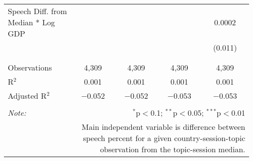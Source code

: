 \begin{table}[!htbp]
\begin{tabular}{@{\extracolsep{5pt}}lcccc}
 Speech Diff. from Median * Log GDP &  &  &  & 0.0002 \\ 
  &  &  &  & (0.011) \\ 
  & & & & \\ 
\hline \\[-1.8ex] 
Observations & 4,309 & 4,309 & 4,309 & 4,309 \\ 
R$^{2}$ & 0.001 & 0.001 & 0.001 & 0.001 \\ 
Adjusted R$^{2}$ & $-$0.052 & $-$0.052 & $-$0.053 & $-$0.053 \\ 
\hline 
\hline \\[-1.8ex] 
\textit{Note:}  & \multicolumn{4}{r}{$^{*}$p$<$0.1; $^{**}$p$<$0.05; $^{***}$p$<$0.01} \\ 
 & \multicolumn{4}{r}{Main independent variable is difference between speech percent for a given country-session-topic observation from the topic-session median.} \\ 
\end{tabular} 
\end{table} 
